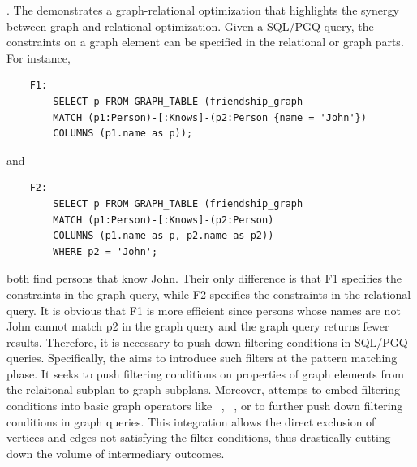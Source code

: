 \filterrule. 
The \filterrule demonstrates a graph-relational optimization that highlights the synergy between graph and relational optimization. 
Given a SQL/PGQ query, the constraints on a graph element can be specified in the relational or graph parts.
For instance, 
\begin{lstlisting}
    F1:
        SELECT p FROM GRAPH_TABLE (friendship_graph 
        MATCH (p1:Person)-[:Knows]-(p2:Person {name = 'John'})
        COLUMNS (p1.name as p));
\end{lstlisting}
and 
\begin{lstlisting}
    F2:
        SELECT p FROM GRAPH_TABLE (friendship_graph 
        MATCH (p1:Person)-[:Knows]-(p2:Person)
        COLUMNS (p1.name as p, p2.name as p2))
        WHERE p2 = 'John';
\end{lstlisting}
both find persons that know John.
Their only difference is that F1 specifies the constraints in the graph query, while F2 specifies the constraints in the relational query.
It is obvious that F1 is more efficient since persons whose names are not John cannot match p2 in the graph query and the graph query returns fewer results.
Therefore, it is necessary to push down filtering conditions in SQL/PGQ queries.
Specifically, the \filterrule aims to introduce such filters at the pattern matching phase. 
It seeks to push filtering conditions on properties of graph elements from the relaitonal subplan to graph subplans.
Moreover, \filterrule attemps to embed filtering conditions into basic graph operators like \scan~, \expandedge~, or \getvertex to further push down filtering conditions in graph queries. 
This integration allows the direct exclusion of vertices and edges not satisfying the filter conditions, thus drastically cutting down the volume of intermediary outcomes.
